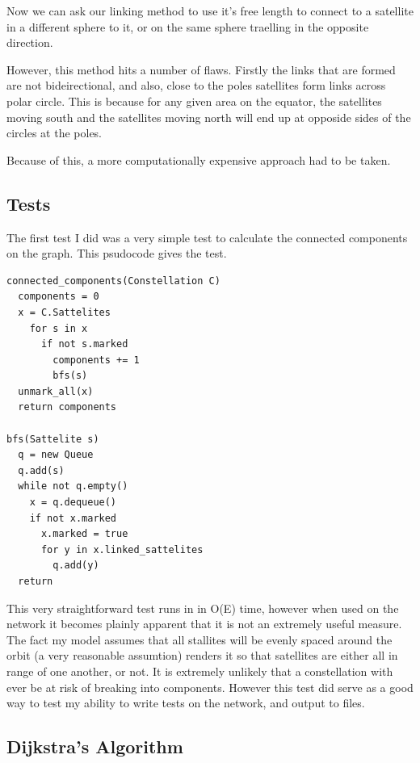 \documentclass[12pt]{article}
\begin{document}
Now we can ask our linking method to use it's free length to connect to a satellite in a different sphere to it, or on the same sphere traelling in the opposite direction.

However, this method hits a number of flaws. Firstly the links that are formed are not bideirectional, and also, close to the poles satellites form links across polar circle. This is because for any given area on the equator, the satellites moving south and the satellites moving north will end up at opposide sides of the circles at the poles.


Because of this, a more computationally expensive approach had to be taken.


\subsection{Tests}

The first test I did was a very simple test to calculate the connected components on the graph. This psudocode gives the test.

\begin{lstlisting}
connected_components(Constellation C)
  components = 0
  x = C.Sattelites
    for s in x
      if not s.marked
        components += 1
        bfs(s)
  unmark_all(x)
  return components

bfs(Sattelite s)
  q = new Queue
  q.add(s)
  while not q.empty()
    x = q.dequeue()
    if not x.marked
      x.marked = true
      for y in x.linked_sattelites
        q.add(y)
  return			
\end{lstlisting}

This very straightforward test runs in in O(E) time, however when used on the network it becomes plainly apparent that it is not an extremely useful measure. The fact my model assumes that all stallites will be evenly spaced around the orbit (a very reasonable assumtion) renders it so that satellites are either all in range of one another, or not. It is extremely unlikely that a constellation with ever be at risk of breaking into components. However this test did serve as a good way to test my ability to write tests on the network, and output to files.

\subsection{Dijkstra's Algorithm}
\end{document}
